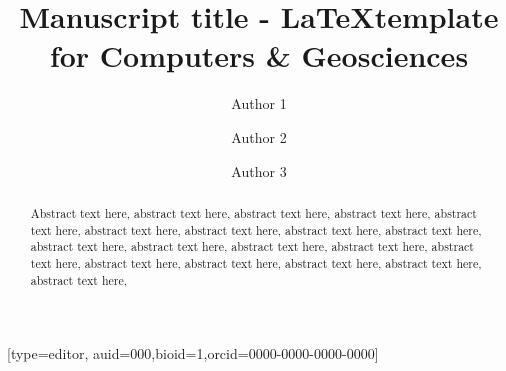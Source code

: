 \documentclass[a4paper,fleqn]{cas-sc}
\begin{document}
\let\WriteBookmarks\relax
\def\floatpagepagefraction{1}
\def\textpagefraction{.001}

\title [mode = title]{Manuscript title - \LaTeX  template for Computers \& Geosciences  }


\author[1]{Author 1}[type=editor,
                        auid=000,bioid=1,orcid=0000-0000-0000-0000]

\author[2]{Author 2} 

\author[3]{Author 3}


\address[1]{Author 1 affiliation}
\address[2]{Author 2 affiliation}
\address[3]{Author 3 affiliation} 

\begin{abstract}
Abstract text here, abstract text here,  abstract text here,  abstract text here,  abstract text here,  abstract text here,  abstract text here,  abstract text here,  abstract text here,  abstract text here,  abstract text here,  abstract text here,  abstract text here,  abstract text here,  abstract text here,  abstract text here,  abstract text here,  abstract text here,  abstract text here,  
\end{abstract}
 
\end{document}
